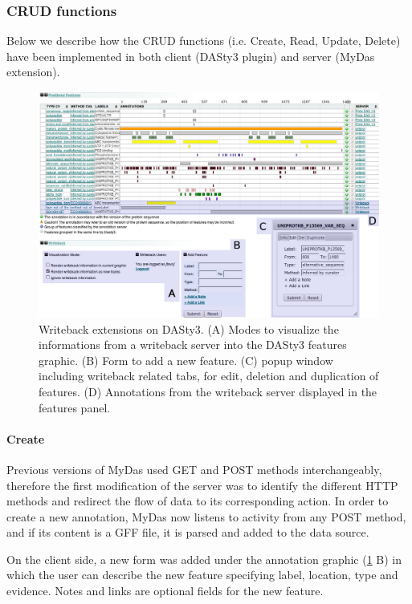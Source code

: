 \subsubsection{CRUD functions}
Below we describe how the CRUD functions (i.e. Create, Read, Update, Delete) have been implemented in both client (DASty3 plugin) and server (MyDas extension).

\begin{figure}[ht]
\centering
\includegraphics[width=6.5in]{figures/dasty3wbT.png} 
\caption[Writeback extensions on DASty3.]{Writeback extensions on DASty3. (A) Modes to visualize the informations from a writeback server into the DASty3 features graphic. (B) Form to add a new feature. (C) popup window including writeback related tabs, for edit, deletion and duplication of features. (D) Annotations from the writeback server displayed in the features panel.  
\label{fig: dasty+wb}}
\end{figure}

\paragraph{Create}
Previous versions of MyDas used GET and POST methods interchangeably, therefore the first modification of the server was to identify the different HTTP methods and redirect the flow of data to its corresponding action. In order to create a new annotation, MyDas now listens to activity from any POST method, and if its content is a GFF file, it is parsed and added to the data source. 

On the client side, a new form was added under the annotation graphic (\ref{fig: dasty+wb} B) in which the user can describe the new feature specifying label, location, type and evidence. Notes and links are optional fields for the new feature. 

